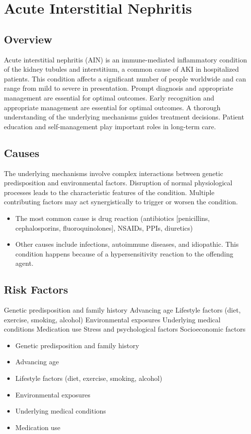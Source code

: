 \chapter{Acute Interstitial Nephritis}
\label{sec:Acute Interstitial Nephritis}

\section{Overview}
Acute interstitial nephritis (AIN) is an immune-mediated inflammatory condition of the kidney tubules and interstitium, a common cause of AKI in hospitalized patients. This condition affects a significant number of people worldwide and can range from mild to severe in presentation. Prompt diagnosis and appropriate management are essential for optimal outcomes. Early recognition and appropriate management are essential for optimal outcomes. A thorough understanding of the underlying mechanisms guides treatment decisions. Patient education and self-management play important roles in long-term care.
\section{Causes}
The underlying mechanisms involve complex interactions between genetic predisposition and environmental factors. Disruption of normal physiological processes leads to the characteristic features of the condition. Multiple contributing factors may act synergistically to trigger or worsen the condition.

\begin{itemize}[noitemsep]
  \item The most common cause is drug reaction (antibiotics [penicillins, cephalosporins, fluoroquinolones], NSAIDs, PPIs, diuretics)
  \item Other causes include infections, autoimmune diseases, and idiopathic. This condition happens because of a hypersensitivity reaction to the offending agent.
\end{itemize}
\section{Risk Factors}
Genetic predisposition and family history Advancing age Lifestyle factors (diet, exercise, smoking, alcohol) Environmental exposures Underlying medical conditions Medication use Stress and psychological factors Socioeconomic factors

\begin{itemize}[noitemsep]
  \item Genetic predisposition and family history
  \item Advancing age
  \item Lifestyle factors (diet, exercise, smoking, alcohol)
  \item Environmental exposures
  \item Underlying medical conditions
  \item Medication use
\end{itemize}
